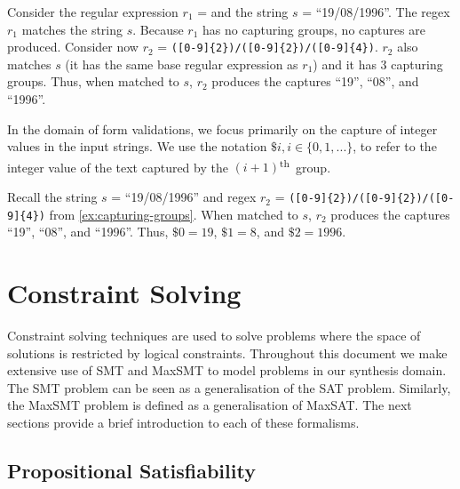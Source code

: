 \begin{example}\label{ex:capturing-groups}
Consider the regular expression \(r_1\) =  and the string \(s\) = ``19/08/1996''. The regex \(r_1\) matches the string \(s\). Because \(r_1\) has no capturing groups, no captures are produced.
%
Consider now \(r_2\) = \verb`([0-9]{2})/([0-9]{2})/([0-9]{4})`. \(r_2\) also matches \(s\) (it has the same base regular expression as \(r_1\)) and it has 3 capturing groups. Thus, when matched to \(s\), \(r_2\) produces the captures ``19'', ``08'', and ``1996''.
%
\end{example}

\noindent
In the domain of form validations, we focus primarily on the capture of integer values in the input strings. We use the notation \(\$i, i \in \{0, 1, ...\}\), to refer to the integer value of the text captured by the \((i+1)\)\textsuperscript{th}~group.

\begin{example}
Recall the string \(s\) = ``19/08/1996'' and regex \(r_2\) = \verb`([0-9]{2})/([0-9]{2})/([0-9]{4})` from \autoref{ex:capturing-groups}. When matched to \(s\), \(r_2\) produces the captures ``19'', ``08'', and ``1996''. Thus, \(\$0 = 19\), \(\$1 = 8\), and \(\$2 = 1996\).
\end{example}

\section{Constraint Solving}\label{sec:logic}
Constraint solving techniques are used to solve problems where the space of solutions is restricted by logical constraints.
Throughout this document we make extensive use of \acf{SMT} and \acf{MaxSMT} to model problems in our synthesis domain.
%
The \ac{SMT} problem can be seen as a generalisation of the \ac{SAT} problem. Similarly, the \ac{MaxSMT} problem is defined as a generalisation of \ac{MaxSAT}. The next sections provide a brief introduction to each of these formalisms.

\subsection{Propositional Satisfiability}

